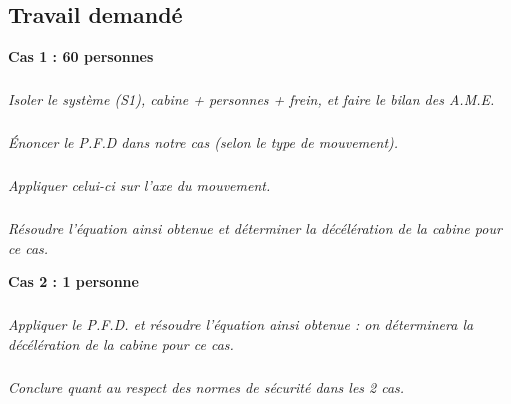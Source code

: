 \documentclass[10pt,fleqn]{book} %
\begin{document}
\begin{multicols}{2}
\subsection*{Travail demandé}

\textbf{Cas 1 : 60 personnes}

\subparagraph{}
\textit{Isoler le système (S1), cabine + personnes + frein, et faire le bilan des A.M.E.}

\subparagraph{}
\textit{Énoncer le P.F.D dans notre cas (selon le type de mouvement).}

\subparagraph{}
\textit{Appliquer celui-ci sur l’axe du mouvement.}

\subparagraph{}
\textit{Résoudre l’équation ainsi obtenue et déterminer la décélération  de la cabine pour ce cas.}

\textbf{Cas 2 : 1 personne}

\subparagraph{}
\textit{Appliquer le P.F.D. et résoudre l’équation ainsi obtenue : on déterminera la décélération  de la cabine pour ce cas.}

\subparagraph{}
\textit{Conclure quant au respect des normes de sécurité dans les 2 cas.}

\end{multicols}
\end{document}
